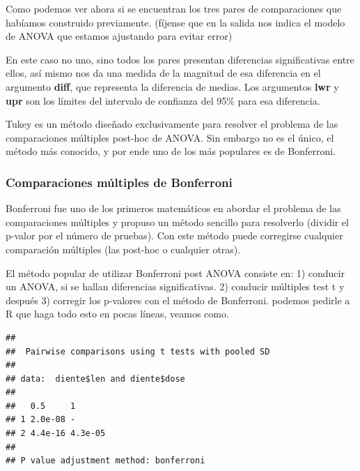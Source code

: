 \documentclass[
]{book}
\newenvironment{Shaded}{\begin{snugshade}}{\end{snugshade}}
\newcommand{\AttributeTok}[1]{\textcolor[rgb]{0.77,0.63,0.00}{#1}}
\newcommand{\FunctionTok}[1]{\textcolor[rgb]{0.00,0.00,0.00}{#1}}
\newcommand{\NormalTok}[1]{#1}
\newcommand{\SpecialCharTok}[1]{\textcolor[rgb]{0.00,0.00,0.00}{#1}}
\newcommand{\StringTok}[1]{\textcolor[rgb]{0.31,0.60,0.02}{#1}}
\begin{document}
Como podemos ver ahora si se encuentran los tres pares de comparaciones que habíamos construido previamente. (fíjense que en la salida nos indica el modelo de ANOVA que estamos ajustando para evitar error)

En este caso no uno, sino todos los pares presentan diferencias significativas entre ellos, así mismo nos da una medida de la magnitud de esa diferencia en el argumento \textbf{diff}, que representa la diferencia de medias. Los argumentos \textbf{lwr} y \textbf{upr} son los límites del intervalo de confianza del 95\% para esa diferencia.

Tukey es un método diseñado exclusivamente para resolver el problema de las comparaciones múltiples post-hoc de ANOVA. Sin embargo no es el único, el método más conocido, y por ende uno de los más populares es de Bonferroni.

\hypertarget{comparaciones-muxfaltiples-de-bonferroni}{%
\subsubsection{Comparaciones múltiples de Bonferroni}\label{comparaciones-muxfaltiples-de-bonferroni}}

Bonferroni fue uno de los primeros matemáticos en abordar el problema de las comparaciones múltiples y propuso un método sencillo para resolverlo (dividir el p-valor por el número de pruebas). Con este método puede corregirse cualquier comparación múltiples (las post-hoc o cualquier otras).

El método popular de utilizar Bonferroni post ANOVA consiste en: 1) conducir un ANOVA, si se hallan diferencias significativas. 2) conducir múltiples test t y después 3) corregir los p-valores con el método de Bonferroni. podemos pedirle a R que haga todo esto en pocas líneas, veamos como.

\begin{Shaded}
\end{Shaded}

\begin{verbatim}
## 
##  Pairwise comparisons using t tests with pooled SD 
## 
## data:  diente$len and diente$dose 
## 
##   0.5     1      
## 1 2.0e-08 -      
## 2 4.4e-16 4.3e-05
## 
## P value adjustment method: bonferroni
\end{verbatim}
\end{document}
